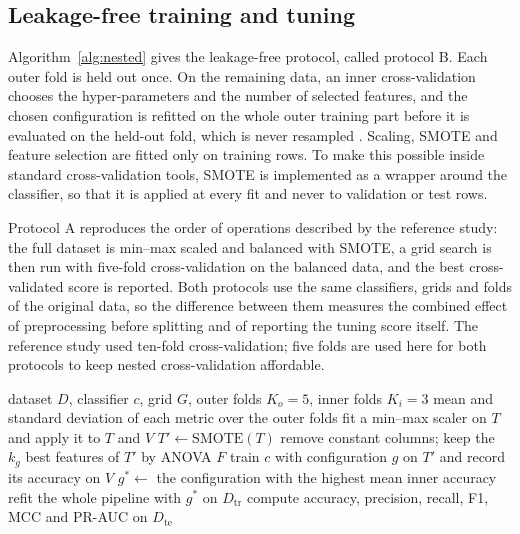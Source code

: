 \documentclass[pdflatex,sn-mathphys-num]{sn-jnl}%
\theoremstyle{thmstyleone}%
\theoremstyle{thmstyletwo}%
\theoremstyle{thmstylethree}%
\begin{document}
\subsection{Leakage-free training and tuning}\label{subsec3-5}

Algorithm~\ref{alg:nested} gives the leakage-free protocol, called protocol B. Each outer fold is held out once. On the remaining data, an inner cross-validation chooses the hyper-parameters and the number of selected features, and the chosen configuration is refitted on the whole outer training part before it is evaluated on the held-out fold, which is never resampled \cite{varma2006}. Scaling, SMOTE \cite{chawla2002} and feature selection are fitted only on training rows. To make this possible inside standard cross-validation tools, SMOTE is implemented as a wrapper around the classifier, so that it is applied at every fit and never to validation or test rows.

Protocol A reproduces the order of operations described by the reference study: the full dataset is min--max scaled and balanced with SMOTE, a grid search is then run with five-fold cross-validation on the balanced data, and the best cross-validated score is reported. Both protocols use the same classifiers, grids and folds of the original data, so the difference between them measures the combined effect of preprocessing before splitting and of reporting the tuning score itself. The reference study used ten-fold cross-validation; five folds are used here for both protocols to keep nested cross-validation affordable.

\begin{algorithm}
\caption{Leakage-free tuning and evaluation (protocol B)}\label{alg:nested}
\begin{algorithmic}[1]
\Require dataset $D$, classifier $c$, grid $G$, outer folds $K_o=5$, inner folds $K_i=3$
\Ensure mean and standard deviation of each metric over the outer folds
      \State fit a min--max scaler on $T$ and apply it to $T$ and $V$
      \State $T' \gets \mathrm{SMOTE}(T)$ 
      \State remove constant columns; keep the $k_g$ best features of $T'$ by ANOVA $F$
      \State train $c$ with configuration $g$ on $T'$ and record its accuracy on $V$
    \EndFor
  \EndFor
  \State $g^\ast \gets$ the configuration with the highest mean inner accuracy
  \State refit the whole pipeline with $g^\ast$ on $D_{\mathrm{tr}}$
  \State compute accuracy, precision, recall, F1, MCC and PR-AUC on $D_{\mathrm{te}}$
\EndFor
\end{algorithmic}
\end{algorithm}
\end{document}
